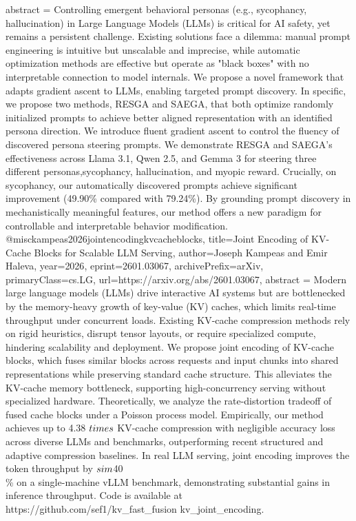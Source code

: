 {      abstract = {Controlling emergent behavioral personas (e.g., sycophancy, hallucination) in Large Language Models (LLMs) is critical for AI safety, yet remains a persistent challenge. Existing solutions face a dilemma: manual prompt engineering is intuitive but unscalable and imprecise, while automatic optimization methods are effective but operate as "black boxes" with no interpretable connection to model internals. We propose a novel framework that adapts gradient ascent to LLMs, enabling targeted prompt discovery. In specific, we propose two methods, RESGA and SAEGA, that both optimize randomly initialized prompts to achieve better aligned representation with an identified persona direction. We introduce fluent gradient ascent to control the fluency of discovered persona steering prompts. We demonstrate RESGA and SAEGA's effectiveness across Llama 3.1, Qwen 2.5, and Gemma 3 for steering three different personas,sycophancy, hallucination, and myopic reward. Crucially, on sycophancy, our automatically discovered prompts achieve significant improvement (49.90\% compared with 79.24\%). By grounding prompt discovery in mechanistically meaningful features, our method offers a new paradigm for controllable and interpretable behavior modification.}
}@misc{kampeas2026jointencodingkvcacheblocks,
      title={Joint Encoding of KV-Cache Blocks for Scalable LLM Serving}, 
      author={Joseph Kampeas and Emir Haleva},
      year={2026},
      eprint={2601.03067},
      archivePrefix={arXiv},
      primaryClass={cs.LG},
      url={https://arxiv.org/abs/2601.03067},
      abstract = {Modern large language models (LLMs) drive interactive AI systems but are bottlenecked by the memory-heavy growth of key-value (KV) caches, which limits real-time throughput under concurrent loads. Existing KV-cache compression methods rely on rigid heuristics, disrupt tensor layouts, or require specialized compute, hindering scalability and deployment.   We propose joint encoding of KV-cache blocks, which fuses similar blocks across requests and input chunks into shared representations while preserving standard cache structure. This alleviates the KV-cache memory bottleneck, supporting high-concurrency serving without specialized hardware. Theoretically, we analyze the rate-distortion tradeoff of fused cache blocks under a Poisson process model. Empirically, our method achieves up to 4.38 $\\times$ KV-cache compression with negligible accuracy loss across diverse LLMs and benchmarks, outperforming recent structured and adaptive compression baselines. In real LLM serving, joint encoding improves the token throughput by $\\sim$40\\\% on a single-machine vLLM benchmark, demonstrating substantial gains in inference throughput. Code is available at https://github.com/sef1/kv_fast_fusion  kv_joint_encoding.}
}
